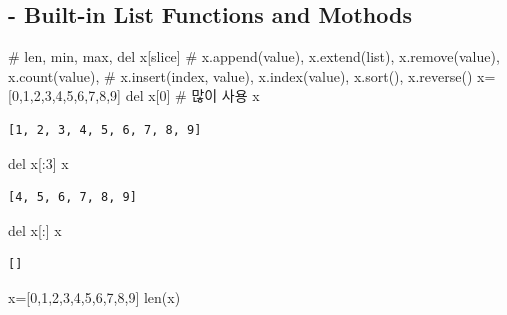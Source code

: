 \documentclass[
  letterpaper,
  DIV=11,
  numbers=noendperiod]{scrreprt}
\newenvironment{Shaded}{\begin{snugshade}}{\end{snugshade}}
\newcommand{\BuiltInTok}[1]{\textcolor[rgb]{0.00,0.23,0.31}{#1}}
\newcommand{\CommentTok}[1]{\textcolor[rgb]{0.37,0.37,0.37}{#1}}
\newcommand{\DecValTok}[1]{\textcolor[rgb]{0.68,0.00,0.00}{#1}}
\newcommand{\KeywordTok}[1]{\textcolor[rgb]{0.00,0.23,0.31}{#1}}
\newcommand{\NormalTok}[1]{\textcolor[rgb]{0.00,0.23,0.31}{#1}}
\newcommand{\OperatorTok}[1]{\textcolor[rgb]{0.37,0.37,0.37}{#1}}
\begin{document}
\subsection{- Built-in List Functions and
Mothods}\label{built-in-list-functions-and-mothods}

\begin{Shaded}
\begin{Highlighting}[]
\CommentTok{\# len, min, max, del x[slice]}
\CommentTok{\# x.append(value), x.extend(list), x.remove(value), x.count(value),}
\CommentTok{\# x.insert(index, value), x.index(value), x.sort(), x.reverse()}
\NormalTok{x}\OperatorTok{=}\NormalTok{[}\DecValTok{0}\NormalTok{,}\DecValTok{1}\NormalTok{,}\DecValTok{2}\NormalTok{,}\DecValTok{3}\NormalTok{,}\DecValTok{4}\NormalTok{,}\DecValTok{5}\NormalTok{,}\DecValTok{6}\NormalTok{,}\DecValTok{7}\NormalTok{,}\DecValTok{8}\NormalTok{,}\DecValTok{9}\NormalTok{]}
\KeywordTok{del}\NormalTok{ x[}\DecValTok{0}\NormalTok{] }\CommentTok{\# 많이 사용}
\NormalTok{x}
\end{Highlighting}
\end{Shaded}

\begin{verbatim}
[1, 2, 3, 4, 5, 6, 7, 8, 9]
\end{verbatim}

\begin{Shaded}
\begin{Highlighting}[]
\KeywordTok{del}\NormalTok{ x[:}\DecValTok{3}\NormalTok{]}
\NormalTok{x}
\end{Highlighting}
\end{Shaded}

\begin{verbatim}
[4, 5, 6, 7, 8, 9]
\end{verbatim}

\begin{Shaded}
\begin{Highlighting}[]
\KeywordTok{del}\NormalTok{ x[:]}
\NormalTok{x}
\end{Highlighting}
\end{Shaded}

\begin{verbatim}
[]
\end{verbatim}

\begin{Shaded}
\begin{Highlighting}[]
\NormalTok{x}\OperatorTok{=}\NormalTok{[}\DecValTok{0}\NormalTok{,}\DecValTok{1}\NormalTok{,}\DecValTok{2}\NormalTok{,}\DecValTok{3}\NormalTok{,}\DecValTok{4}\NormalTok{,}\DecValTok{5}\NormalTok{,}\DecValTok{6}\NormalTok{,}\DecValTok{7}\NormalTok{,}\DecValTok{8}\NormalTok{,}\DecValTok{9}\NormalTok{]}
\BuiltInTok{len}\NormalTok{(x)}
\end{Highlighting}
\end{Shaded}
\end{document}
